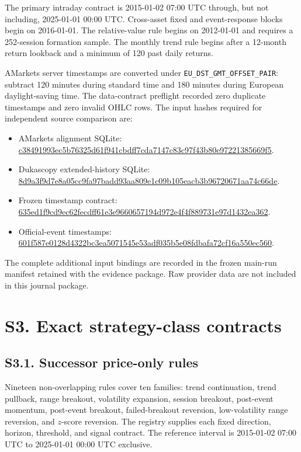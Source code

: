 \documentclass[a4paper,fleqn]{cas-sc}
\begin{document}
The primary intraday contract is 2015-01-02 07:00 UTC through, but not including, 2025-01-01 00:00 UTC. Cross-asset fixed and event-response blocks begin on 2016-01-01. The relative-value rule begins on 2012-01-01 and requires a 252-session formation sample. The monthly trend rule begins after a 12-month return lookback and a minimum of 120 past daily returns.

AMarkets server timestamps are converted under \texttt{EU\_DST\_GMT\_OFFSET\_PAIR}: subtract 120 minutes during standard time and 180 minutes during European daylight-saving time. The data-contract preflight recorded zero duplicate timestamps and zero invalid OHLC rows. The input hashes required for independent source comparison are:

\begin{itemize}
\item AMarkets alignment SQLite: \url{c38491993ec5b76325d61f941cbdff7cda7147c83c97f43b80e97221385669f5}.
\item Dukascopy extended-history SQLite: \url{8d9a3f9d7e8a05cc9fa97badd93aa809e1c09b105eacb3b96720671aa74c66de}.
\item Frozen timestamp contract: \url{635ed1f9cd9ec62fecdff61e3e9660657194d972e4f4f889731e97d1432ea362}.
\item Official-event timestamps: \url{601f587e0128d4322bc3ea5071545e53adf035b5e08fdbafa72cf16a550ec560}.
\end{itemize}

The complete additional input bindings are recorded in the frozen main-run manifest retained with the evidence package. Raw provider data are not included in this journal package.

\section*{S3. Exact strategy-class contracts}

\subsection*{S3.1. Successor price-only rules}

Nineteen non-overlapping rules cover ten families: trend continuation, trend pullback, range breakout, volatility expansion, session breakout, post-event momentum, post-event breakout, failed-breakout reversion, low-volatility range reversion, and $z$-score reversion. The registry supplies each fixed direction, horizon, threshold, and signal contract. The reference interval is 2015-01-02 07:00 UTC to 2025-01-01 00:00 UTC exclusive.
\end{document}
